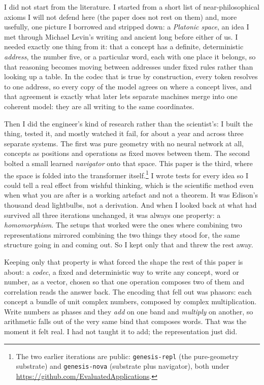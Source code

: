\documentclass[11pt]{article}
\begin{document}
I did not start from the literature. I started from a short list of near-philosophical axioms I will not
defend here (the paper does not rest on them) and, more usefully, one picture I borrowed and stripped
down: a \emph{Platonic space}, an idea I met through Michael Levin's writing
\parencite{levin_platonic_blog} and ancient long before either of us. I needed exactly one thing from it:
that a concept has a definite, deterministic \emph{address}, the number five, or a particular word, each
with one place it belongs, so that reasoning becomes moving between addresses under fixed rules rather
than looking up a table. In the codec that is true by construction, every token resolves to one address,
so every copy of the model agrees on where a concept lives, and that agreement is exactly what later lets
separate machines merge into one coherent model: they are all writing to the same coordinates.

Then I did the engineer's kind of research rather than the scientist's: I built the thing, tested it,
and mostly watched it fail, for about a year and across three separate systems. The first was pure
geometry with no neural network at all, concepts as positions and operations as fixed moves between
them. The second bolted a small learned \emph{navigator} onto that space. This paper is the third, where
the space is folded into the transformer itself.\footnote{The two earlier iterations are public:
\texttt{genesis-repl} (the pure-geometry substrate) and \texttt{genesis-nova} (substrate plus
navigator), both under \url{https://github.com/EvaluatedApplications}.} I wrote tests for every idea so I
could tell a real effect from wishful thinking, which is the scientific method even when what you are
after is a working artefact and not a theorem. It was Edison's thousand dead lightbulbs, not a
derivation. And when I looked back at what had survived all three iterations unchanged, it was always
one property: a \emph{homomorphism}. The setups that worked were the ones where combining two
representations mirrored combining the two things they stood for, the same structure going in and coming
out. So I kept only that and threw the rest away.

Keeping only that property is what forced the shape the rest of this paper is about: a \emph{codec}, a
fixed and deterministic way to write any concept, word or number, as a vector, chosen so that one
operation composes two of them and correlation reads the answer back. The encoding that fell out was
phasors: each concept a bundle of unit complex numbers, composed by complex multiplication. Write
numbers as phases and they \emph{add} on one band and \emph{multiply} on another, so arithmetic falls
out of the very same bind that composes words. That was the moment it felt real. I had not taught it to
add; the representation just did.
\end{document}
